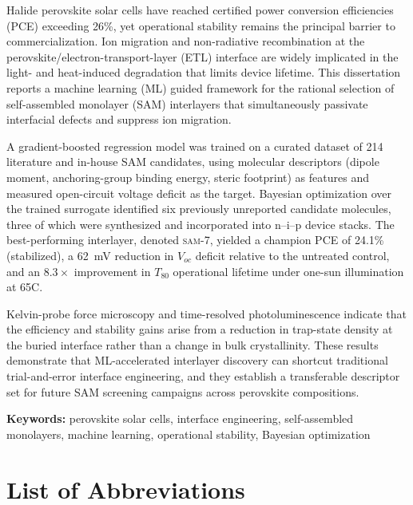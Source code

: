 \documentclass[12pt,a4paper,oneside]{report}
\begin{document}
Halide perovskite solar cells have reached certified power conversion
efficiencies (PCE) exceeding 26\%, yet operational stability remains the
principal barrier to commercialization. Ion migration and non-radiative
recombination at the perovskite/electron-transport-layer (ETL) interface are
widely implicated in the light- and heat-induced degradation that limits
device lifetime. This dissertation reports a machine learning (ML) guided
framework for the rational selection of self-assembled monolayer (SAM)
interlayers that simultaneously passivate interfacial defects and suppress
ion migration.

A gradient-boosted regression model was trained on a curated dataset of 214
literature and in-house SAM candidates, using molecular descriptors (dipole
moment, anchoring-group binding energy, steric footprint) as features and
measured open-circuit voltage deficit as the target. Bayesian optimization
over the trained surrogate identified six previously unreported candidate
molecules, three of which were synthesized and incorporated into
n--i--p device stacks. The best-performing interlayer, denoted
\textsc{sam-7}, yielded a champion PCE of 24.1\% (stabilized), a 62~mV
reduction in $V_{oc}$ deficit relative to the untreated control, and an
$8.3\times$ improvement in $T_{80}$ operational lifetime under
one-sun illumination at 65\textdegree C.

Kelvin-probe force microscopy and time-resolved photoluminescence indicate
that the efficiency and stability gains arise from a reduction in trap-state
density at the buried interface rather than a change in bulk crystallinity.
These results demonstrate that ML-accelerated interlayer discovery can
shortcut traditional trial-and-error interface engineering, and they
establish a transferable descriptor set for future SAM screening campaigns
across perovskite compositions.

\vspace{0.8cm}
\textbf{Keywords:} perovskite solar cells, interface engineering,
self-assembled monolayers, machine learning, operational stability,
Bayesian optimization

\clearpage

\tableofcontents
\clearpage
\listoffigures
\clearpage
\listoftables
\clearpage

\chapter*{List of Abbreviations}
\thispagestyle{plain}
\end{document}
